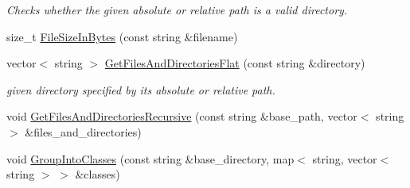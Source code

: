 \begin{DoxyCompactItemize}
\begin{DoxyCompactList}\small\item\em Checks whether the given absolute or relative path is a valid directory. \end{DoxyCompactList}\item 
size\-\_\-t \hyperlink{class_tree_scanner_af9f6d985cb42d2cd7505b1213edd04b8}{File\-Size\-In\-Bytes} (const string \&filename)
\item 
vector$<$ string $>$ \hyperlink{class_tree_scanner_aa67c5724102c0634ba151cbed2d897e6}{Get\-Files\-And\-Directories\-Flat} (const string \&directory)
\begin{DoxyCompactList}\small\item\em given directory specified by its absolute or relative path. \end{DoxyCompactList}\item 
void \hyperlink{class_tree_scanner_a042ddf3be0d3960dbca0362fb52cd1cd}{Get\-Files\-And\-Directories\-Recursive} (const string \&base\-\_\-path, vector$<$ string $>$ \&files\-\_\-and\-\_\-directories)
\item 
void \hyperlink{class_tree_scanner_add67141b6bca7a3abc72ea305ac915bd}{Group\-Into\-Classes} (const string \&base\-\_\-directory, map$<$ string, vector$<$ string $>$ $>$ \&classes)
\end{DoxyCompactItemize}


